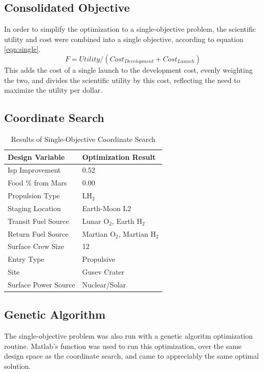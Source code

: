\documentclass[]{aiaa-pretty}
\begin{document}
\subsection{Consolidated Objective}
In order to simplify the optimization to a single-objective problem, the scientific utility and cost were combined into a single objective, according to equation \ref{eqn:single}.
\begin{equation}
F = Utility/(Cost_{Development}+Cost_{Launch})
\label{eqn:single}
\end{equation}
This adds the cost of a single launch to the development cost, evenly weighting the two, and divides the scientific utility by this cost, reflecting the need to maximize the utility per dollar.
\subsection{Coordinate Search}
\begin{table}[h!]
	\centering
	\caption{Results of Single-Objective Coordinate Search}
	\label{tab:GAsingle}
	\begin{tabular}{ll}
		\textbf{Design Variable} & \textbf{Optimization Result}\\ \hline
		Isp Improvement & 0.52 \\
		Food \% from Mars & 0.00 \\
		Propulsion Type & LH$_2$ \\
		Staging Location & Earth-Moon L2 \\
		Transit Fuel Source & Lunar O$_2$, Earth H$_2$ \\
		Return Fuel Source & Martian O$_2$, Martian H$_2$ \\
		Surface Crew Size & 12\\
		Entry Type & Propulsive \\
		Site & Gusev Crater \\
		Surface Power Source & Nuclear/Solar\\
	\end{tabular}
\end{table}
\subsection{Genetic Algorithm}

The single-objective problem was also run with a genetic algoritm optimization routine. Matlab's  function was used to run this optimization, over the same design space as the coordinate search, and came to appreciably the same optimal solution.
\end{document}
